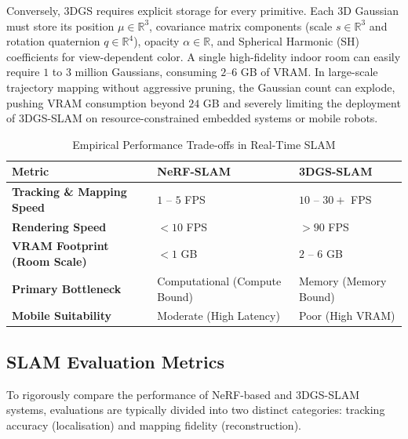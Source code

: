 Conversely, 3DGS requires explicit storage for every primitive. Each 3D Gaussian must store its position $\mu \in \mathbb{R}^3$, covariance matrix components (scale $s \in \mathbb{R}^3$ and rotation quaternion $q \in \mathbb{R}^4$), opacity $\alpha \in \mathbb{R}$, and Spherical Harmonic (SH) coefficients for view-dependent color. 
A single high-fidelity indoor room can easily require $1$ to $3$ million Gaussians, consuming $2$--$6$ GB of VRAM. In large-scale trajectory mapping without aggressive pruning, the Gaussian count can explode, pushing VRAM consumption beyond $24$ GB and severely limiting the deployment of 3DGS-SLAM on resource-constrained embedded systems or mobile robots.

\begin{table}[H]
  \centering
  \caption{Empirical Performance Trade-offs in Real-Time SLAM}
  \label{tab:performance_comparison}
  \renewcommand{\arraystretch}{1.4}
  \begin{tabular}{l p{3.5cm} p{3.5cm}}
    \toprule
    \textbf{Metric} & \textbf{NeRF-SLAM} & \textbf{3DGS-SLAM} \\
    \midrule
    \textbf{Tracking \& Mapping Speed} & $1$ -- $5$ FPS & $10$ -- $30+$ FPS \\
    \textbf{Rendering Speed} & $< 10$ FPS & $> 90$ FPS \\
    \textbf{VRAM Footprint (Room Scale)} & $< 1$ GB & $2$ -- $6$ GB \\
    \textbf{Primary Bottleneck} & Computational \newline (Compute Bound) & Memory \newline (Memory Bound) \\
    \textbf{Mobile Suitability} & Moderate \newline (High Latency) & Poor \newline (High VRAM) \\
    \bottomrule
  \end{tabular}
\end{table}

\subsection{SLAM Evaluation Metrics}

To rigorously compare the performance of NeRF-based and 3DGS-SLAM systems, evaluations are typically divided into two distinct categories: tracking accuracy (localisation) and mapping fidelity (reconstruction).

